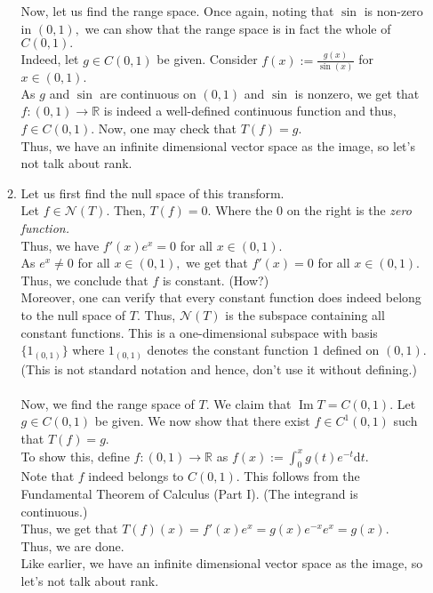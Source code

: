 \documentclass{article}
\renewcommand{\Im}{\operatorname{Im}}
\begin{document}
\begin{enumerate}
\begin{enumerate}[label=(\alph*)]
		Now, let us find the range space. Once again, noting that $\sin$ is non-zero in $(0, 1),$ we can show that the range space is in fact the whole of $C(0, 1).$\\
		Indeed, let $g \in C(0, 1)$ be given. Consider $f(x) := \frac{g(x)}{\sin(x)}$ for $x \in (0, 1).$\\
		As $g$ and $\sin$ are continuous on $(0, 1)$ and $\sin$ is nonzero, we get that $f:(0, 1)\to\mathbb{R}$ is indeed a well-defined continuous function and thus, $f \in C(0, 1).$ Now, one may check that $T(f) = g.$\\
		Thus, we have an infinite dimensional vector space as the image, so let's not talk about rank.
		\item Let us first find the null space of this transform.\\
		Let $f \in \mathcal{N}(T).$ Then, $T(f) = 0.$ Where the $0$ on the right is the \emph{zero function.}\\
		Thus, we have $f'(x)e^x = 0$ for all $x \in (0, 1).$\\
		As $e^x \neq 0$ for all $x \in (0, 1),$ we get that $f'(x) = 0$ for all $x \in (0, 1).$ Thus, we conclude that $f$ is constant. \hfill (How?)\\
		Moreover, one can verify that every constant function does indeed belong to the null space of $T.$ Thus, $\mathcal{N}(T)$ is the subspace containing all constant functions. This is a one-dimensional subspace with basis $\{1_{(0, 1)}\}$ where $1_{(0, 1)}$ denotes the constant function $1$ defined on $(0, 1).$ (This is not standard notation and hence, don't use it without defining.)\\~\\
		Now, we find the range space of $T.$ We claim that $\Im T = C(0, 1).$ Let $g \in C(0, 1)$ be given. We now show that there exist $f \in C^1(0, 1)$ such that $T(f) = g.$\\
		To show this, define $f:(0, 1) \to \mathbb{R}$ as $f(x) := \displaystyle\int_{0}^{x} g(t)e^{-t} \text{d}t.$\\
		Note that $f$ indeed belongs to $C(0, 1).$ This follows from the Fundamental Theorem of Calculus (Part I). (The integrand is continuous.)\\
		Thus, we get that $T(f)(x) = f'(x)e^x = g(x)e^{-x}e^x = g(x).$\\
		Thus, we are done.\\
		Like earlier, we have an infinite dimensional vector space as the image, so let's not talk about rank.
	\end{enumerate}

\end{enumerate}
\end{document}
